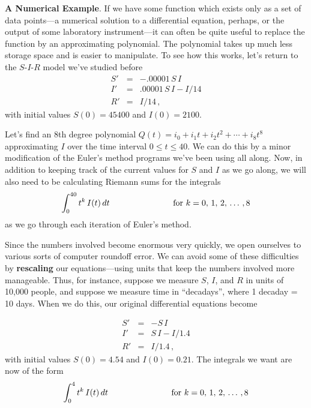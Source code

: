 {{{{\medskip



{\bf A Numerical Example}.  If we have some function 
which exists only as a set of data points---a numerical solution to a differential equation, perhaps, or the output of some laboratory instrument---it can often be quite useful to replace the function by an approximating polynomial.  The polynomial takes up much less storage space and is easier to manipulate.  To see how this works, let's return to the $S$-$I$-$R$ model we've studied before
\begin{eqnarray*}
S'&=& -.00001\, S\, I \\
I'&=& .00001\, S\, I -  I/14 \\
R'&=& I/14 \, ,
\end{eqnarray*}
with initial values $S(0)=45400$ and $I(0)=2100$.

Let's find an 8th degree polynomial $Q(t)=i_0+i_1t+i_2t^2+\cdots +i_8t^8$ approximating $I$ over the time interval $0\le t\le 40$.  We can do this by a minor modification of the Euler's method programs we've been using all along.  Now, in addition to keeping track of the current values for $S$ and $I$ as we go along, we will also need to be calculating Riemann sums for the integrals
\[
\int_0^{40} t^k\,I(t)\,dt \hspace{1.0in} \mbox{ for } k=0,\,1,\,2,\,\ldots\,,8
\]
as we go through each iteration of Euler's method.  

Since the numbers involved become enormous very quickly, we open ourselves to various sorts of computer 
roundoff error.  We can avoid some of these difficulties by {\bf rescaling} our equations---using units that keep the numbers involved more manageable.  Thus, for instance, suppose we measure $S$, $I$, and $R$ in units of 10,000 people, and suppose we measure time in ``decadays'', where 1 decaday = 10 days.  When we do this, our original differential equations become

\pagebreak
\begin{eqnarray*}
S'&=& -S\, I \\
I'&=& S\, I -  I/1.4 \\
R'&=& I/1.4 \, ,
\end{eqnarray*}
with initial values $S(0)=4.54$ and $I(0)=0.21$.  The integrals we want are now of the form
\[
\int_0^{4} t^k\,I(t)\,dt \hspace{1.0in} \mbox{ for } k=0,\,1,\,2,\,\ldots\,,8
\]

}}}}
